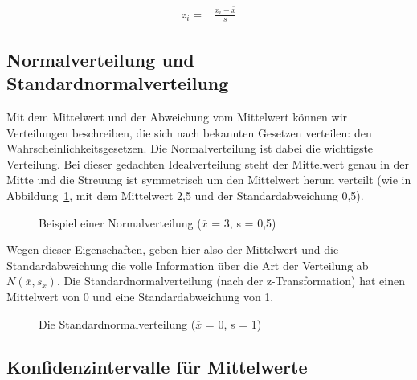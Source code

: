 \documentclass[
  10pt,
  letterpaper,
  a4paper, twoside]{scrreprt}
\begin{document}
\begin{align}    
  z_i= & \frac{x_i-\bar{x}}{s} \label{eq:z-Transformation} 
\end{align}

\subsection{Normalverteilung und
Standardnormalverteilung}\label{normalverteilung-und-standardnormalverteilung}

Mit dem Mittelwert und der Abweichung vom Mittelwert können wir
Verteilungen beschreiben, die sich nach bekannten Gesetzen verteilen:
den Wahrscheinlichkeitsgesetzen. Die Normalverteilung ist dabei die
wichtigste Verteilung. Bei dieser gedachten Idealverteilung steht der
Mittelwert genau in der Mitte und die Streuung ist symmetrisch um den
Mittelwert herum verteilt (wie in Abbildung~\ref{fig-Normalverteilung},
mit dem Mittelwert 2,5 und der Standardabweichung 0,5).

\begin{figure}[H]

\caption{\label{fig-Normalverteilung}Beispiel einer Normalverteilung
(\(\overline{x}\) = 3, s = 0,5)}


\end{figure}%

Wegen dieser Eigenschaften, geben hier also der Mittelwert und die
Standardabweichung die volle Information über die Art der Verteilung ab
\(N(\overline{x},s_x)\). Die Standardnormalverteilung (nach der
z-Transformation) hat einen Mittelwert von 0 und eine Standardabweichung
von 1.

\begin{figure}[H]

\caption{\label{fig-Standardnormalverteilung}Die
Standardnormalverteilung (\(\overline{x}\) = 0, s = 1)}


\end{figure}%

\subsection{Konfidenzintervalle für
Mittelwerte}\label{konfidenzintervalle-fuxfcr-mittelwerte}
\end{document}
